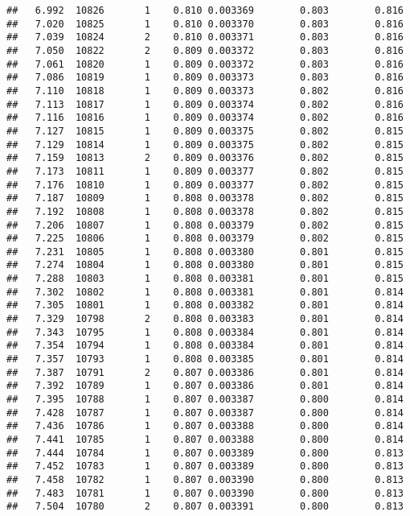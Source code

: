 \documentclass[
]{book}
\begin{document}
\begin{verbatim}
##   6.992  10826       1    0.810 0.003369        0.803        0.816
##   7.020  10825       1    0.810 0.003370        0.803        0.816
##   7.039  10824       2    0.810 0.003371        0.803        0.816
##   7.050  10822       2    0.809 0.003372        0.803        0.816
##   7.061  10820       1    0.809 0.003372        0.803        0.816
##   7.086  10819       1    0.809 0.003373        0.803        0.816
##   7.110  10818       1    0.809 0.003373        0.802        0.816
##   7.113  10817       1    0.809 0.003374        0.802        0.816
##   7.116  10816       1    0.809 0.003374        0.802        0.816
##   7.127  10815       1    0.809 0.003375        0.802        0.815
##   7.129  10814       1    0.809 0.003375        0.802        0.815
##   7.159  10813       2    0.809 0.003376        0.802        0.815
##   7.173  10811       1    0.809 0.003377        0.802        0.815
##   7.176  10810       1    0.809 0.003377        0.802        0.815
##   7.187  10809       1    0.808 0.003378        0.802        0.815
##   7.192  10808       1    0.808 0.003378        0.802        0.815
##   7.206  10807       1    0.808 0.003379        0.802        0.815
##   7.225  10806       1    0.808 0.003379        0.802        0.815
##   7.231  10805       1    0.808 0.003380        0.801        0.815
##   7.274  10804       1    0.808 0.003380        0.801        0.815
##   7.288  10803       1    0.808 0.003381        0.801        0.815
##   7.302  10802       1    0.808 0.003381        0.801        0.814
##   7.305  10801       1    0.808 0.003382        0.801        0.814
##   7.329  10798       2    0.808 0.003383        0.801        0.814
##   7.343  10795       1    0.808 0.003384        0.801        0.814
##   7.354  10794       1    0.808 0.003384        0.801        0.814
##   7.357  10793       1    0.808 0.003385        0.801        0.814
##   7.387  10791       2    0.807 0.003386        0.801        0.814
##   7.392  10789       1    0.807 0.003386        0.801        0.814
##   7.395  10788       1    0.807 0.003387        0.800        0.814
##   7.428  10787       1    0.807 0.003387        0.800        0.814
##   7.436  10786       1    0.807 0.003388        0.800        0.814
##   7.441  10785       1    0.807 0.003388        0.800        0.814
##   7.444  10784       1    0.807 0.003389        0.800        0.813
##   7.452  10783       1    0.807 0.003389        0.800        0.813
##   7.458  10782       1    0.807 0.003390        0.800        0.813
##   7.483  10781       1    0.807 0.003390        0.800        0.813
##   7.504  10780       2    0.807 0.003391        0.800        0.813

\end{verbatim}
\end{document}
